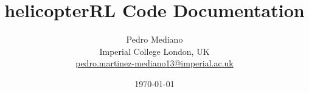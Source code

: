 \newcommand{\te}[1]{\text{#1}}
\newcommand{\dpp}{\mathrm{\partial}}
\newcommand{\pdiff}[2]{\frac{\dpp #1}{\dpp #2}}

\setcounter{secnumdepth}{3}

\title{\bf helicopterRL Code Documentation} 

\author{Pedro Mediano\\
Imperial College London, UK\\
\url{pedro.martinez-mediano13@imperial.ac.uk}
}

\date{\today}

